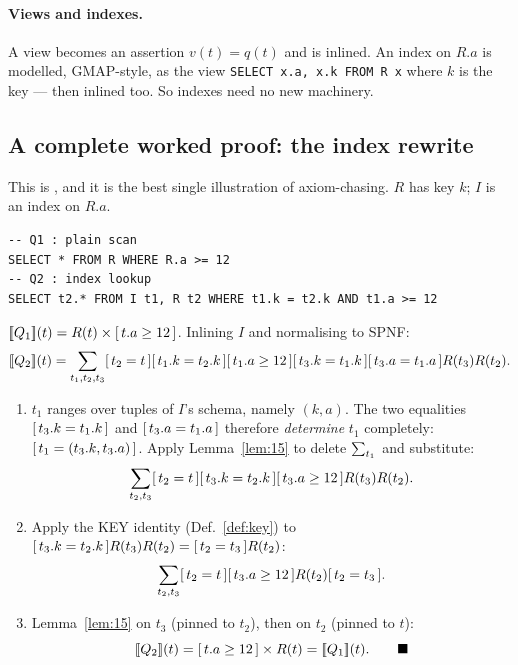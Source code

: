 \paragraph{Views and indexes.} A view becomes an assertion $v(t)=q(t)$ and is inlined. An
index on $R.a$ is modelled, GMAP-style, as the view
\lstinline|SELECT x.a, x.k FROM R x| where $k$ is the key --- then inlined too. So indexes
need no new machinery.

\subsection{A complete worked proof: the index rewrite}
\label{sec:udp-worked}

This is \cite[Ex.\ 4.7]{udp}, and it is the best single illustration of axiom-chasing.
$R$ has key $k$; $I$ is an index on $R.a$.

\begin{lstlisting}[style=sql]
-- Q1 : plain scan
SELECT * FROM R WHERE R.a >= 12
-- Q2 : index lookup
SELECT t2.* FROM I t1, R t2 WHERE t1.k = t2.k AND t1.a >= 12
\end{lstlisting}

$[\![ Q_1 ]\!](t) = R(t)\times[\,t.a\ge 12\,]$. Inlining $I$ and normalising to SPNF:
\[
[\![ Q_2 ]\!](t)=\sum_{t_1,t_2,t_3}
[\,t_2=t\,][\,t_1.k=t_2.k\,][\,t_1.a\ge12\,][\,t_3.k=t_1.k\,][\,t_3.a=t_1.a\,]R(t_3)R(t_2).
\]

\begin{enumerate}
\item $t_1$ ranges over tuples of $I$'s schema, namely $(k,a)$. The two equalities
      $[\,t_3.k=t_1.k\,]$ and $[\,t_3.a=t_1.a\,]$ therefore \emph{determine} $t_1$
      completely: $[\,t_1 = (t_3.k,t_3.a)\,]$. Apply Lemma~\ref{lem:15} to delete
      $\sum_{t_1}$ and substitute:
      \[
      \sum_{t_2,t_3}[\,t_2=t\,][\,t_3.k=t_2.k\,][\,t_3.a\ge12\,]R(t_3)R(t_2).
      \]
\item Apply the KEY identity (Def.~\ref{def:key}) to
      $[\,t_3.k=t_2.k\,]R(t_3)R(t_2) = [\,t_2=t_3\,]R(t_2)$:
      \[
      \sum_{t_2,t_3}[\,t_2=t\,][\,t_3.a\ge12\,]R(t_2)[\,t_2=t_3\,].
      \]
\item Lemma~\ref{lem:15} on $t_3$ (pinned to $t_2$), then on $t_2$ (pinned to $t$):
      \[
      [\![ Q_2 ]\!](t) = [\,t.a\ge12\,]\times R(t) = [\![ Q_1 ]\!](t).\qquad\blacksquare
      \]
\end{enumerate}


